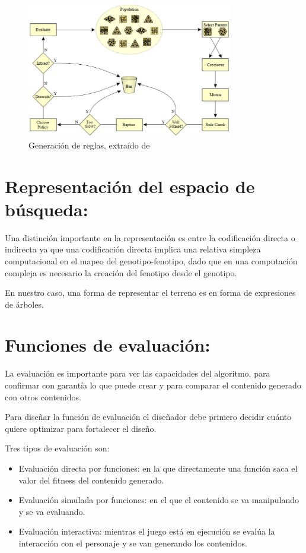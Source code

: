 \begin{figure}[h!]

	\centering
	\includegraphics[width=9cm]{./eps/fig2.eps}
	\caption{Generación de reglas, extraído de \cite{B3}}
	\label{Figura2}

\end{figure}

\section{Representación del espacio de búsqueda:}

Una distinción importante en la representación es entre la codificación directa o indirecta ya que una codificación directa implica una relativa simpleza computacional en el mapeo del genotipo-fenotipo, dado que en una computación compleja es necesario la creación del fenotipo desde el genotipo\cite{B6}\cite{B7}.

En nuestro caso, una forma de representar el terreno es en forma de expresiones de árboles.


\section{Funciones de evaluación:}	

La evaluación es importante para ver las capacidades del algoritmo, para confirmar con garantía lo que puede crear y para comparar el contenido generado con otros contenidos\cite{B8}.


Para diseñar la función de evaluación el diseñador debe primero decidir cuánto quiere optimizar para fortalecer el diseño.\cite{B8}


Tres tipos de evaluación son:

\begin{itemize}

\item Evaluación directa por funciones: en la que directamente una función saca el valor del fitness del contenido generado\cite{B8}.

\item Evaluación simulada por funciones: en el que el contenido se va manipulando y se va evaluando\cite{B8}.


\item Evaluación interactiva: mientras el juego está en ejecución se evalúa la interacción con el personaje y se van generando los contenidos\cite{B8}.

\end{itemize}

